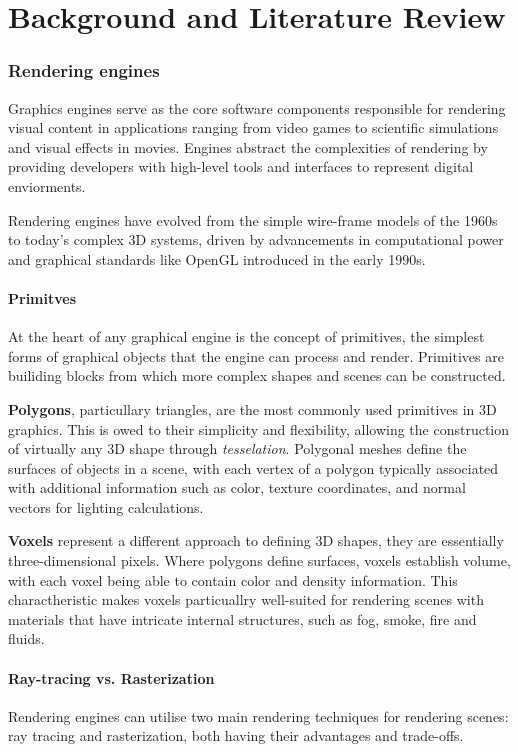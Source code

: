 
\part{Background and Literature Review}\label{backgorund}
\section{Rendering engines}
Graphics engines serve as the core software components responsible for rendering visual content in applications ranging from video games to scientific simulations and visual effects in movies.
Engines abstract the complexities of rendering by providing developers with high-level tools and interfaces to represent digital enviorments.

Rendering engines have evolved from the simple wire-frame models of the 1960s to today's complex 3D systems, driven by advancements in computational power and graphical standards\cite{old} like OpenGL introduced in the early 1990s.

\subsection{Primitves}
At the heart of any graphical engine is the concept of primitives, the simplest forms of graphical objects that the engine can process and render. Primitives are builiding blocks from which more complex shapes and scenes can be constructed.

\textbf{Polygons}, particullary triangles, are the most commonly used primitives in 3D graphics. This is owed to their simplicity and flexibility, allowing the construction of virtually any 3D shape through \emph{tesselation}. Polygonal meshes define the surfaces of objects in a scene, with each vertex of a polygon typically associated with additional information such as color, texture coordinates, and normal vectors for lighting calculations.

\textbf{Voxels} represent a different approach to defining 3D shapes, they are essentially three-dimensional pixels. Where polygons define surfaces, voxels establish volume, with each voxel being able to contain color and density information.
This charactheristic makes voxels particuallry well-suited for rendering scenes with materials that have intricate internal structures, such as fog, smoke, fire and fluids.

\subsection{Ray-tracing vs. Rasterization}
Rendering engines can utilise two main rendering techniques for rendering scenes: ray tracing and rasterization, both having their advantages and trade-offs.


